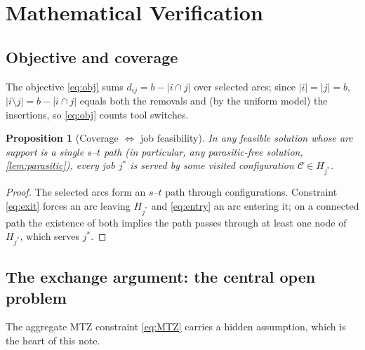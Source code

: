 \documentclass[11pt,a4paper]{article}
\theoremstyle{plain}
\newtheorem{proposition}[theorem]{Proposition}
\theoremstyle{definition}
\begin{document}
\section{Mathematical Verification}
\label{sec:verify}

\subsection{Objective and coverage}

The objective \eqref{eq:obj} sums $d_{ij}=b-|i\cap j|$ over selected arcs; since
$|i|=|j|=b$, $|i\setminus j|=b-|i\cap j|$ equals both the removals and (by the uniform
model) the insertions, so \eqref{eq:obj} counts tool switches.

\begin{thmbox}
	\begin{proposition}[Coverage $\Leftrightarrow$ job feasibility]
		\label{prop:coverage}
		In any feasible solution whose arc support is a single $s$--$t$ path (in particular,
		any parasitic-free solution, \cref{lem:parasitic}), every job $j^{*}$ is served by
		some visited configuration $\mathcal{C}\in H_{j^{*}}$.
	\end{proposition}
\end{thmbox}
\begin{proofbox}
	\begin{proof}
		The selected arcs form an $s$--$t$ path through configurations. Constraint
		\eqref{eq:exit} forces an arc leaving $H_{j^{*}}$ and \eqref{eq:entry} an arc entering
		it; on a connected path the existence of both implies the path passes through at least
		one node of $H_{j^{*}}$, which serves $j^{*}$.
	\end{proof}
\end{proofbox}

\subsection{The exchange argument: the central open problem}
\label{sec:exchange}

The aggregate MTZ constraint \eqref{eq:MTZ} carries a hidden assumption, which is the
heart of this note.
\end{document}
